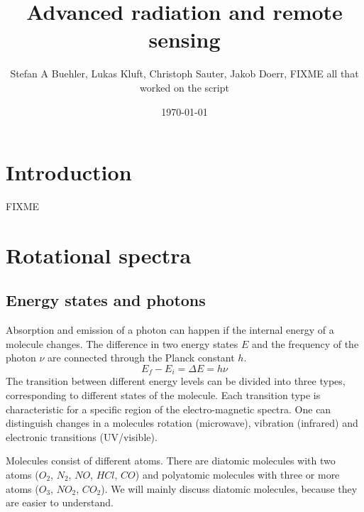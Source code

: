 \documentclass[a4paper,fleqn]{article}
\title{Advanced radiation and remote sensing}
\author{Stefan A Buehler, Lukas Kluft, Christoph Sauter, Jakob Doerr, FIXME all that worked on
the script}
\date{\today}
\begin{document}
\maketitle
\thispagestyle{empty}\pagestyle{empty}
\tableofcontents
\newpage\pagestyle{fancy}

\section{Introduction}

FIXME

\section{Rotational spectra}

\subsection{Energy states and photons}
Absorption and emission of a photon can happen if the internal energy of a
molecule changes. The difference in two energy states $E$ and the frequency of
the photon $\nu$ are connected through the Planck constant $h$.
\begin{equation}
  E_f - E_i = \Delta E = h \nu
\end{equation}
The transition between different energy levels can be divided into three types,
corresponding to different states of the molecule.  Each transition type is
characteristic for a specific region of the electro-magnetic spectra.  One can
distinguish changes in a molecules rotation (microwave), vibration (infrared)
and electronic transitions (UV/visible).

Molecules consist of different atoms. There are diatomic molecules with two
atoms ($O_2$, $N_2$, $NO$, $HCl$, $CO$) and polyatomic molecules with
three or more atoms ($O_3$, $NO_2$, $CO_2$). We will mainly discuss
diatomic molecules, because they are easier to understand.
\end{document}
